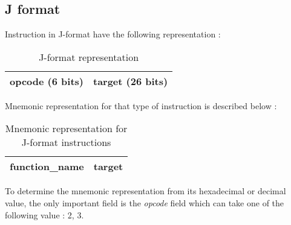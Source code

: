 \subsection*{J format}

	Instruction in J-format have the following representation :
	
	\begin{table}[H]
		\centering
		\begin{tabular}{|c|c|}
			\hline
			opcode (6 bits) & target (26 bits)\\
			\hline
		\end{tabular}
		\caption{J-format representation}
	\end{table}
	
	Mnemonic representation for that type of instruction is described below :
	\begin{table}[H]
		\centering
		\begin{tabular}{|c|c|}
			\hline
			function\_name & target\\
			\hline
		\end{tabular}
		\caption{Mnemonic representation for J-format instructions}
	\end{table}
	
	To determine the mnemonic representation from its hexadecimal or decimal value, the only important field is the \textit{opcode} field which can take one of the following value : 2, 3.